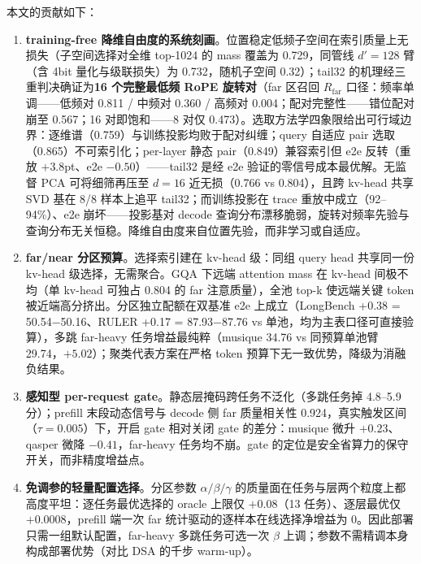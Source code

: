 \documentclass[11pt]{article}
\begin{document}
本文的贡献如下：
\begin{enumerate}
\item \textbf{training-free 降维自由度的系统刻画}。位置稳定低频子空间在索引质量上无损失（子空间选择对全维 top-1024 的 mass 覆盖为 0.729，同管线 $d'{=}128$ 臂（含 4bit 量化与级联损失）为 0.732，随机子空间 0.32）；tail32 的机理经三重判决确证为\textbf{16 个完整最低频 RoPE 旋转对}（far 区召回 $R_{\mathrm{far}}$ 口径：频率单调——低频对 0.811 / 中频对 0.360 / 高频对 0.004；配对完整性——错位配对崩至 0.567；16 对即饱和——8 对仅 0.473）。选取方法学四象限给出可行域边界：逐维谱（0.759）与训练投影均败于配对纠缠；query 自适应 pair 选取（0.865）不可索引化；per-layer 静态 pair（0.849）兼容索引但 e2e 反转（重放 $+3.8$pt、e2e $-0.50$）——tail32 是经 e2e 验证的零信号成本最优解。无监督 PCA 可将细筛再压至 $d{=}16$ 近无损（0.766 vs 0.804），且跨 kv-head 共享 SVD 基在 8/8 样本上追平 tail32；而训练投影在 trace 重放中成立（92--94\%）、e2e 崩坏——投影基对 decode 查询分布漂移脆弱，旋转对频率先验与查询分布无关恒稳。降维自由度来自位置先验，而非学习或自适应。
\item \textbf{far/near 分区预算}。选择索引建在 kv-head 级：同组 query head 共享同一份 kv-head 级选择，无需聚合。GQA 下远端 attention mass 在 kv-head 间极不均（单 kv-head 可独占 0.804 的 far 注意质量），全池 top-k 使远端关键 token 被近端高分挤出。分区独立配额在双基准 e2e 上成立（LongBench +0.38 = 50.54$-$50.16、RULER +0.17 = 87.93$-$87.76 vs 单池，均为主表口径可直接验算），多跳 far-heavy 任务增益最纯粹（musique 34.76 vs 同预算单池臂 29.74，$+5.02$）；聚类代表方案在严格 token 预算下无一致优势，降级为消融负结果。
\item \textbf{感知型 per-request gate}。静态层掩码跨任务不泛化（多跳任务掉 4.8--5.9 分）；prefill 末段动态信号与 decode 侧 far 质量相关性 0.924，真实触发区间（$\tau{=}0.005$）下，开启 gate 相对关闭 gate 的差分：musique 微升 $+0.23$、qasper 微降 $-0.41$，far-heavy 任务均不崩。gate 的定位是安全省算力的保守开关，而非精度增益点。
\item \textbf{免调参的轻量配置选择}。分区参数 $\alpha/\beta/\gamma$ 的质量面在任务与层两个粒度上都高度平坦：逐任务最优选择的 oracle 上限仅 $+0.08$（13 任务）、逐层最优仅 $+0.0008$，prefill 端一次 far 统计驱动的逐样本在线选择净增益为 0。因此部署只需一组默认配置，far-heavy 多跳任务可选一次 $\beta$ 上调；参数不需精调本身构成部署优势（对比 DSA 的千步 warm-up）。
\end{enumerate}

\end{document}
